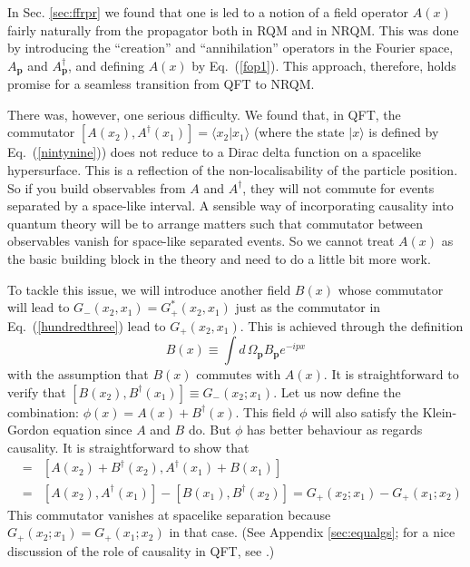 \documentclass[12pt]{article}
\def\eq#1{{Eq.~(\ref{#1})}}
\def\ket#1{|#1\rangle}                    %
\def\amp#1#2{\langle #1 | #2\rangle}      %
\begin{document}
In Sec. \ref{sec:ffrpr} we found that one is led to a notion of a field operator $A(x)$ fairly naturally from the propagator both in RQM and in NRQM. This was done by introducing the  
``creation'' and ``annihilation'' operators in the Fourier space, $A_{\bm{p}}$ and $A^\dagger_{\bm{p}}$, and defining $A(x)$ by \eq{fop1}. This approach, therefore, holds promise for a seamless transition from QFT to NRQM. 

There was, however, one serious difficulty.  We found that, in QFT, the commutator $[A(x_2), A^\dagger(x_1)]=\amp{x_2}{x_1}$ (where the state $\ket{x}$ is defined by \eq{nintynine}) does not reduce to a Dirac delta function on a spacelike hypersurface. This is a reflection of the non-localisability of the particle position. 
 So if you build observables from $A$ and $A^\dagger$, they will not commute for events separated by a space-like interval. A sensible way of incorporating causality into quantum theory will be to arrange matters such that commutator between observables vanish for space-like separated events. So we cannot treat $A(x)$ as the basic building block in the theory and  need to do a little bit more work. 

To tackle this issue, we will introduce another field $B(x)$ whose commutator will lead to $G_-(x_2, x_1)=G_+^*(x_2,x_1)$ just as the commutator in \eq{hundredthree} lead to $G_+(x_2,x_1)$. This is achieved through the definition  
\begin{equation}
B(x) \equiv \int d\, \Omega_{\bm{p}} B_{\bm{p}}e^{-ipx}
\end{equation} 
with the assumption that $B(x)$ commutes with $A(x)$. It is straightforward to verify that 
 $
 [B(x_2), B^\dagger(x_1)]  \equiv G_-(x_2;x_1)
$.
  Let us now  define the combination:
$
 \phi(x) = A(x) + B^\dagger(x)
$. This field $\phi$ will also satisfy the Klein-Gordon equation since $A$ and $B$ do. But $\phi$ has better behaviour as regards causality. It is straightforward to show that 
\begin{eqnarray}
[\phi(x_2), \phi^\dagger(x_1)]&=& [A(x_2) + B^\dagger(x_2), A^\dagger(x_1) + B(x_1) ] \\
&=& [ A(x_2), A^\dagger(x_1)] - [B(x_1), B^\dagger(x_2)]
=  G_+(x_2;x_1) - G_+(x_1;x_2)\nonumber 
\end{eqnarray} 
This commutator vanishes at spacelike separation because $G_+(x_2;x_1) = G_+(x_1;x_2)$ in that case. (See Appendix \ref{sec:equalgs}; for a nice discussion of the role of causality in QFT, see \cite{NO}.)
\end{document}
